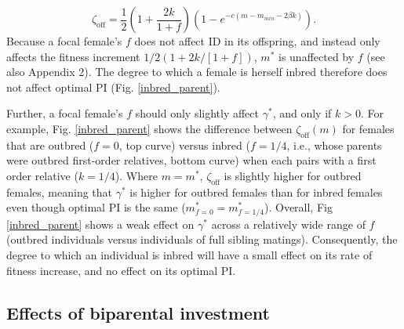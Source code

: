 \documentclass[10pt,letterpaper]{article}
\begin{document}
\begin{equation} \label{maineqr}
\zeta_{\textrm{off}} = \frac{1}{2}\left(1+\frac{2k}{1+f}\right)\left(1-e^{-c\left(m-m_{min}-2\beta k\right)}\right).
\end{equation}
Because a focal female's $f$ does not affect ID in its offspring, and instead only affects the fitness increment $1/2\left(1+ 2 k / \left[1 + f\right]\right)$, $m^{*}$ is unaffected by $f$  (see also Appendix 2). The degree to which a female is herself inbred therefore does not affect optimal PI (Fig. \ref{inbred_parent}). 

Further, a focal female's $f$ should only slightly affect $\gamma^{*}$, and only if $k>0$. For example, Fig. \ref{inbred_parent} shows the difference between $\zeta_{\textrm{off}}(m)$ for females that are outbred ($f=0$, top curve) versus inbred ($f=1/4$, i.e., whose parents were outbred first-order relatives, bottom curve) when each pairs with a first order relative ($k=1/4$). Where $m=m^{*}$, $\zeta_{\textrm{off}}$ is slightly higher for outbred females, meaning that $\gamma^{*}$ is higher for outbred females than for inbred females even though optimal PI is the same ($m^{*}_{f=0}=m^{*}_{f=1/4}$). Overall, Fig \ref{inbred_parent} shows a weak effect on $\gamma^{*}$ across a relatively wide range of $f$ (outbred individuals versus individuals of full sibling matings). Consequently, the degree to which an individual is inbred will have a small effect on its rate of fitness increase, and no effect on its optimal PI.

\subsection*{Effects of biparental investment}
\end{document}
